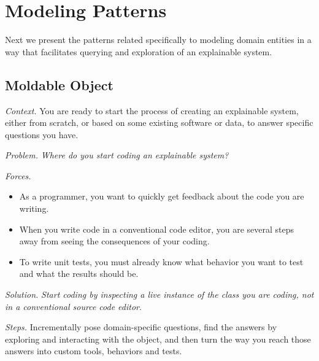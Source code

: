 \documentclass[acmsmall,screen,authorversion,nonacm]{acmart} %
\newcommand\cp[1]{\nbe{Cesare}{#1}{olive}} %
\newcommand\ws[1]{\nbe{Workshop}{#1}{teal}} %
\newcommand{\pattern}[2]{\needlines{10}
\subsection*{#1}\label{pat:#2}}
\newcommand{\patsec}[1]{\noindent\textit{#1.}\xspace}
\begin{document}
\section{Modeling Patterns}\label{sec:modeling}

Next we present the patterns related specifically to modeling domain entities in a way that facilitates querying and exploration of an explainable system.

\pattern{Moldable Object}{MoldableObject}


\patsec{Context}
You are ready to start the process of creating an explainable system, either from scratch, or based on some existing software or data, to answer specific questions you have.

\patsec{Problem}
\emph{Where do you start coding an explainable system?}

\patsec{Forces}
\begin{itemize}[---]
\item As a programmer, you want to quickly get feedback about the code you are writing.
\item When you write code in a conventional code editor, you are several steps away from seeing the consequences of your coding.
\item To write unit tests, you must already know what behavior you want to test and what the results should be.
\end{itemize}

\patsec{Solution}
\emph{Start coding by inspecting a live instance of the class you are coding, not in a conventional source code editor}.

\patsec{Steps}
Incrementally pose domain-specific questions, find the answers by exploring and interacting with the object, and then turn the way you reach those answers into custom tools, behaviors and tests.
\end{document}
